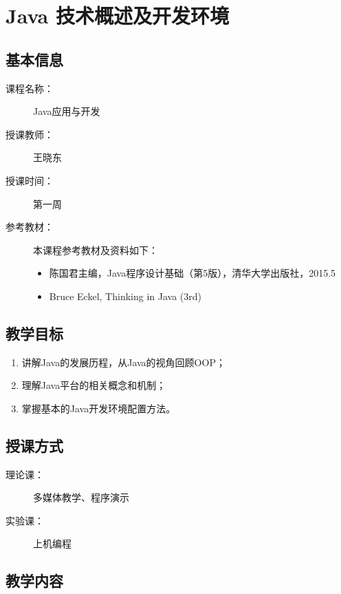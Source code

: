 \chapter{Java 技术概述及开发环境}
\label{chp:Introduction-to-Java}

\section*{基本信息}
\sline
\begin{description}
\item[课程名称：] Java应用与开发
\item[授课教师：] 王晓东
\item[授课时间：] 第一周
\item[参考教材：] 本课程参考教材及资料如下：
  \begin{itemize}
  \item 陈国君主编，Java程序设计基础（第5版），清华大学出版社，2015.5
  \item Bruce Eckel, Thinking in Java (3rd)
  \end{itemize}
\end{description}

\section*{教学目标}

\sline
\begin{enumerate}
\item 讲解Java的发展历程，从Java的视角回顾OOP；
\item 理解Java平台的相关概念和机制；
\item 掌握基本的Java开发环境配置方法。
\end{enumerate}  

\section*{授课方式}

\sline
\begin{description}
\item[理论课：] 多媒体教学、程序演示
\item[实验课：] 上机编程
\end{description}

\newpage
\section*{教学内容}
\sline

